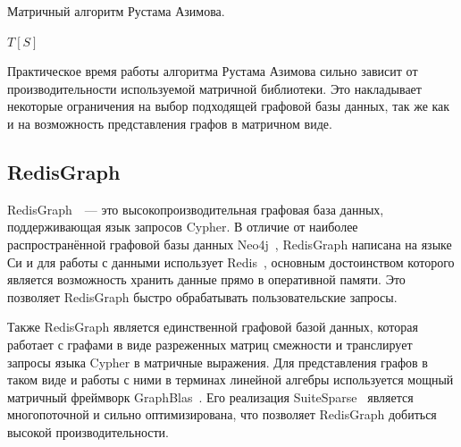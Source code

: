 
\begin{algorithm}
\caption{Матричный алгоритм Рустама Азимова.}

\begin{algorithmic}[1]
        \EndFor
    \EndFor    
        \EndFor
    \EndWhile
\State \Return $T[S]$
\EndFunction

\end{algorithmic}
\end{algorithm}

Практическое время работы алгоритма Рустама Азимова сильно зависит от производительности используемой матричной библиотеки. Это накладывает некоторые ограничения на выбор подходящей графовой базы данных, так же как и на возможность представления графов в матричном виде.

\subsection{RedisGraph}
RedisGraph~\cite{redis-graph}~--- это высокопроизводительная графовая база данных, поддерживающая язык запросов Cypher. В отличие от наиболее распространённой графовой базы данных Neo4j~\cite{neo4j}, RedisGraph написана на языке Си и для работы с данными использует Redis~\cite{redis}, основным достоинством которого является возможность хранить данные прямо в оперативной памяти. Это позволяет RedisGraph быстро обрабатывать пользовательские запросы.

Также RedisGraph является единственной графовой базой данных, которая работает с графами в виде разреженных матриц смежности и транслирует запросы языка Cypher в матричные выражения. Для представления графов в таком виде и работы с ними в терминах линейной алгебры используется мощный матричный фреймворк GraphBlas~\cite{graph-blas}. Его реализация SuiteSparse~\cite{suite-sparse} является многопоточной и сильно оптимизирована, что позволяет RedisGraph добиться высокой производительности.

